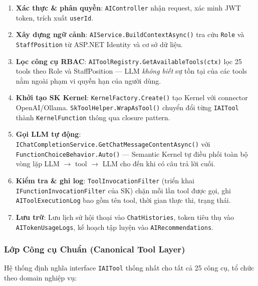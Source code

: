 \begin{enumerate}
    \item \textbf{Xác thực \& phân quyền}: \texttt{AIController} nhận request, xác minh JWT token, trích xuất \texttt{userId}.

    \item \textbf{Xây dựng ngữ cảnh}: \texttt{AIService.BuildContextAsync()} tra cứu \texttt{Role} và \texttt{StaffPosition} từ ASP.NET Identity và cơ sở dữ liệu.

    \item \textbf{Lọc công cụ RBAC}: \texttt{AIToolRegistry.GetAvailableTools(ctx)} lọc 25 tools theo Role và StaffPosition --- LLM \textit{không biết} sự tồn tại của các tools nằm ngoài phạm vi quyền hạn của người dùng.

    \item \textbf{Khởi tạo SK Kernel}: \texttt{KernelFactory.Create()} tạo Kernel với connector OpenAI/Ollama. \texttt{SkToolHelper.WrapAsTool()} chuyển đổi từng \texttt{IAITool} thành \texttt{KernelFunction} thông qua closure pattern.

    \item \textbf{Gọi LLM tự động}: \texttt{IChatCompletionService.GetChatMessageContentAsync()} với \texttt{FunctionChoiceBehavior.Auto()} --- Semantic Kernel tự điều phối toàn bộ vòng lặp LLM $\to$ tool $\to$ LLM cho đến khi có câu trả lời cuối.

    \item \textbf{Kiểm tra \& ghi log}: \texttt{ToolInvocationFilter} (triển khai \texttt{IFunctionInvocationFilter} của SK) chặn mỗi lần tool được gọi, ghi \texttt{AIToolExecutionLog} bao gồm tên tool, thời gian thực thi, trạng thái.

    \item \textbf{Lưu trữ}: Lưu lịch sử hội thoại vào \texttt{ChatHistories}, token tiêu thụ vào \texttt{AITokenUsageLogs}, kế hoạch tập luyện vào \texttt{AIRecommendations}.
\end{enumerate}

\subsubsection{Lớp Công cụ Chuẩn (Canonical Tool Layer)}

Hệ thống định nghĩa interface \texttt{IAITool} thống nhất cho tất cả 25 công cụ, tổ chức theo domain nghiệp vụ:

